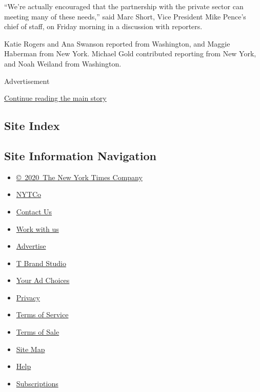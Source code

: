 ``We're actually encouraged that the partnership with the private sector
can meeting many of these needs,'' said Marc Short, Vice President Mike
Pence's chief of staff, on Friday morning in a discussion with
reporters.

Katie Rogers and Ana Swanson reported from Washington, and Maggie
Haberman from New York. Michael Gold contributed reporting from New
York, and Noah Weiland from Washington.

Advertisement

\protect\hyperlink{after-bottom}{Continue reading the main story}

\hypertarget{site-index}{%
\subsection{Site Index}\label{site-index}}

\hypertarget{site-information-navigation}{%
\subsection{Site Information
Navigation}\label{site-information-navigation}}

\begin{itemize}
\tightlist
\item
  \href{https://help.nytimes.com/hc/en-us/articles/115014792127-Copyright-notice}{©~2020~The
  New York Times Company}
\end{itemize}

\begin{itemize}
\tightlist
\item
  \href{https://www.nytco.com/}{NYTCo}
\item
  \href{https://help.nytimes.com/hc/en-us/articles/115015385887-Contact-Us}{Contact
  Us}
\item
  \href{https://www.nytco.com/careers/}{Work with us}
\item
  \href{https://nytmediakit.com/}{Advertise}
\item
  \href{http://www.tbrandstudio.com/}{T Brand Studio}
\item
  \href{https://www.nytimes.com/privacy/cookie-policy\#how-do-i-manage-trackers}{Your
  Ad Choices}
\item
  \href{https://www.nytimes.com/privacy}{Privacy}
\item
  \href{https://help.nytimes.com/hc/en-us/articles/115014893428-Terms-of-service}{Terms
  of Service}
\item
  \href{https://help.nytimes.com/hc/en-us/articles/115014893968-Terms-of-sale}{Terms
  of Sale}
\item
  \href{https://spiderbites.nytimes.com}{Site Map}
\item
  \href{https://help.nytimes.com/hc/en-us}{Help}
\item
  \href{https://www.nytimes.com/subscription?campaignId=37WXW}{Subscriptions}
\end{itemize}
